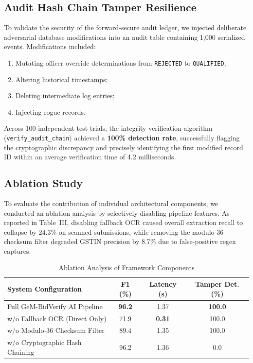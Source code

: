 \documentclass[conference]{IEEEtran}
\begin{document}
\subsection{Audit Hash Chain Tamper Resilience}
To validate the security of the forward-secure audit ledger, we injected deliberate adversarial database modifications into an audit table containing 1,000 serialized events. Modifications included:
\begin{enumerate}
    \item Mutating officer override determinations from \texttt{REJECTED} to \texttt{QUALIFIED};
    \item Altering historical timestamps;
    \item Deleting intermediate log entries;
    \item Injecting rogue records.
\end{enumerate}
Across 100 independent test trials, the integrity verification algorithm (\texttt{verify\_audit\_chain}) achieved a \textbf{100\% detection rate}, successfully flagging the cryptographic discrepancy and precisely identifying the first modified record ID within an average verification time of 4.2 milliseconds.

\subsection{Ablation Study}
To evaluate the contribution of individual architectural components, we conducted an ablation analysis by selectively disabling pipeline features. As reported in Table~III, disabling fallback OCR caused overall extraction recall to collapse by 24.3\% on scanned submissions, while removing the modulo-36 checksum filter degraded GSTIN precision by 8.7\% due to false-positive regex captures.

\begin{table}[!ht]
\centering
\caption{Ablation Analysis of Framework Components}
\label{tab:ablation}
\begin{tabularx}{\columnwidth}{Xccc}
\toprule
\textbf{System Configuration} & \textbf{F1 (\%)} & \textbf{Latency (s)} & \textbf{Tamper Det. (\%)} \\
\midrule
Full GeM-BidVerify AI Pipeline & \textbf{96.2} & 1.37 & \textbf{100.0} \\
w/o Fallback OCR (Direct Only) & 71.9 & \textbf{0.31} & 100.0 \\
w/o Modulo-36 Checksum Filter & 89.4 & 1.35 & 100.0 \\
w/o Cryptographic Hash Chaining & 96.2 & 1.36 & 0.0 \\
\bottomrule
\end{tabularx}
\end{table}
\end{document}
